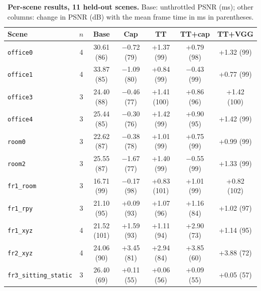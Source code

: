 \begin{table}[tbp]
\centering
\footnotesize\setlength{\tabcolsep}{1.5pt}
\begin{tabular}{lcccccc}
\toprule
\textbf{Scene} & $n$ & \textbf{Base} & \textbf{Cap} & \textbf{TT} & \textbf{TT+cap} & \textbf{TT+VGG} \\
\midrule
\texttt{office0} & 4 & 30.61 (86) & $-$0.72 (79) & +1.37 (99) & +0.79 (98) & +1.32 (99) \\
\texttt{office1} & 4 & 33.87 (85) & $-$1.09 (80) & +0.84 (99) & $-$0.43 (99) & +0.77 (99) \\
\texttt{office3} & 3 & 24.40 (88) & $-$0.46 (77) & +1.41 (100) & +0.86 (96) & +1.42 (100) \\
\texttt{office4} & 3 & 25.44 (85) & $-$0.30 (76) & +1.42 (99) & +0.90 (95) & +1.42 (99) \\
\texttt{room0} & 3 & 22.62 (87) & $-$0.38 (78) & +1.01 (99) & +0.75 (99) & +0.99 (99) \\
\texttt{room2} & 3 & 25.55 (87) & $-$1.67 (77) & +1.40 (99) & $-$0.55 (99) & +1.33 (99) \\
\texttt{fr1\_room} & 3 & 16.71 (99) & $-$0.17 (98) & +0.83 (101) & +1.01 (99) & +0.82 (102) \\
\texttt{fr1\_rpy} & 3 & 21.10 (95) & +0.09 (93) & +1.07 (96) & +1.16 (84) & +1.02 (97) \\
\texttt{fr1\_xyz} & 4 & 21.52 (101) & +1.59 (93) & +1.11 (94) & +2.90 (73) & +1.14 (95) \\
\texttt{fr2\_xyz} & 4 & 24.06 (90) & +3.45 (81) & +2.94 (84) & +3.85 (60) & +3.88 (72) \\
\texttt{fr3\_sitting\_static} & 3 & 26.40 (69) & +0.11 (55) & +0.06 (56) & +0.09 (55) & +0.05 (57) \\
\bottomrule
\end{tabular}
\caption{\textbf{Per-scene results, 11 held-out scenes.} Base: unthrottled PSNR (ms); other columns: change in PSNR (dB) with the mean frame time in ms in parentheses.}
\label{tab:method_scenes}
\end{table}
